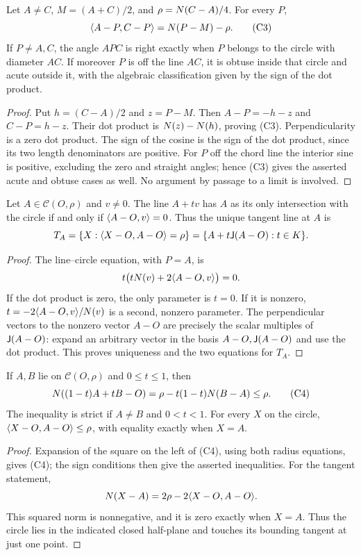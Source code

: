 \begin{theorem}
\label{circ:thales}
Let $A\ne C$, $M=(A+C)/2$, and $\rho=N(C-A)/4$.
For every $P$,
\[
 \langle A-P,C-P\rangle=N(P-M)-\rho.                 \tag{C3}
\]
If $P\ne A,C$, the angle $APC$ is right exactly when $P$ belongs to the
circle with diameter $AC$.  If moreover $P$ is off the line $AC$, it is
obtuse inside that circle and acute outside it, with the algebraic
classification given by the sign of the dot product.
\end{theorem}
\begin{proof}
Put $h=(C-A)/2$ and $z=P-M$.  Then $A-P=-h-z$ and $C-P=h-z$.
Their dot product is $N(z)-N(h)$, proving (C3).
Perpendicularity is a zero dot product.  The sign of the cosine is the
sign of the dot product, since its two length denominators are positive.
For $P$ off the chord line the interior sine is positive, excluding the
zero and straight angles; hence (C3) gives the asserted acute and obtuse
cases as well.
No argument by passage to a limit is involved.
\end{proof}

\begin{theorem}
\label{circ:tangent}
Let $A\in\mathcal C(O,\rho)$ and $v\ne0$.
The line $A+tv$ has $A$ as its only intersection with the circle if and
only if $\langle A-O,v\rangle=0$.  Thus the unique tangent line at $A$ is
\[
 T_A=\{X:\langle X-O,A-O\rangle=\rho\}
     =\{A+t\mathsf J(A-O):t\in K\}.
\]
\end{theorem}
\begin{proof}
The line--circle equation, with $P=A$, is
\[
 t\bigl(tN(v)+2\langle A-O,v\rangle\bigr)=0.
\]
If the dot product is zero, the only parameter is $t=0$.  If it is
nonzero, $t=-2\langle A-O,v\rangle/N(v)$ is a second, nonzero parameter.
The perpendicular vectors to the nonzero vector $A-O$ are precisely the
scalar multiples of $\mathsf J(A-O)$: expand an arbitrary vector in the basis
$A-O,\mathsf J(A-O)$ and use the dot product.  This proves uniqueness and the
two equations for $T_A$.
\end{proof}

\begin{theorem}
\label{circ:convexity}
If $A,B$ lie on $\mathcal C(O,\rho)$ and $0\le t\le1$, then
\[
 N((1-t)A+tB-O)
   =\rho-t(1-t)N(B-A)\le\rho.                \tag{C4}
\]
The inequality is strict if $A\ne B$ and $0<t<1$.
For every $X$ on the circle,
$\langle X-O,A-O\rangle\le\rho$, with equality exactly when $X=A$.
\end{theorem}
\begin{proof}
Expansion of the square on the left of (C4), using both radius equations,
gives (C4); the sign conditions then give the asserted inequalities.
For the tangent statement,
\[
 N(X-A)=2\rho-2\langle X-O,A-O\rangle.
\]
This squared norm is nonnegative, and it is zero exactly when $X=A$.
Thus the circle lies in the indicated closed half-plane and touches its
bounding tangent at just one point.
\end{proof}

